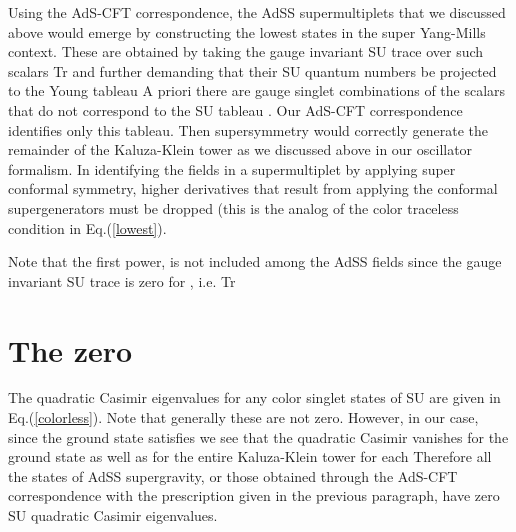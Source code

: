 \documentclass[a4paper,aps,preprint,nofootinbib]{revtex4}
\begin{document}
Using the AdS-CFT correspondence, the AdS\coordHE{}S\coordHE{} supermultiplets
that we discussed above would emerge by constructing the lowest states in
the super Yang-Mills context. These are obtained by taking the gauge
invariant SU\coordHE{} trace over \coordHE{} such scalars Tr\myHighlight{$\left( \phi^{%
\left[ a_{1}b_{1}\right] }\ldots\phi^{\left[ a_{C}b_{C}\right] }\right) ,$}\coordHE{}
and further demanding that their SU\myHighlight{$\left( 4\right) $}\coordHE{} quantum numbers be
projected to the Young tableau \coordHE{} A priori there are
gauge singlet combinations of the scalars that do not correspond to the SU\coordHE{} tableau \coordHE{}. Our AdS-CFT correspondence identifies
only this tableau. Then supersymmetry would correctly generate the remainder
of the Kaluza-Klein tower as we discussed above in our oscillator formalism.
In identifying the fields in a supermultiplet by applying super conformal
symmetry, higher derivatives that result from applying the conformal
supergenerators must be dropped (this is the analog of the color traceless
condition in Eq.(\ref{lowest}).

Note that the first power, \coordHE{} is not included among the AdS\coordHE{}S\coordHE{} fields since the gauge invariant SU\coordHE{} trace is zero
for \coordHE{}, i.e. Tr\coordHE{}

\section{The zero}

The quadratic Casimir eigenvalues for any color singlet states of SU\coordHE{} are given in Eq.(\ref{colorless}). Note that generally these
are not zero. However, in our case, since the ground state satisfies \coordHE{} we see that the quadratic Casimir vanishes for the
ground state \coordHE{} as well as for the entire Kaluza-Klein
tower for each \coordHE{} Therefore all the states of AdS\coordHE{}S\coordHE{}
supergravity, or those obtained through the AdS-CFT correspondence with the
prescription given in the previous paragraph, have zero SU\coordHE{} quadratic Casimir eigenvalues.
\end{document}
